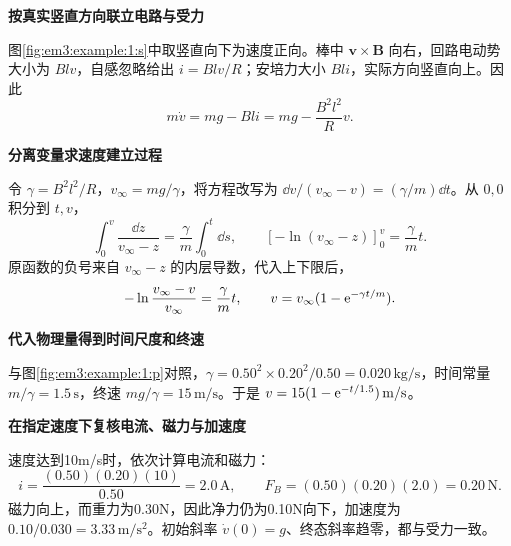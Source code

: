 \begin{solution}\textbf{按真实竖直方向联立电路与受力}\par\nobreak
图\ref{fig:em3:example:1:s}中取竖直向下为速度正向。棒中 $\bm v\times\bm B$ 向右，回路电动势大小为 $Blv$，自感忽略给出 $i=Blv/R$；安培力大小 $Bli$，实际方向竖直向上。因此
\[m\dot v=mg-Bli=mg-\frac{B^2l^2}{R}v.\]


\par\medskip{}\noindent\textbf{分离变量求速度建立过程}\par\nobreak
令 $\gamma=B^2l^2/R$，$v_\infty=mg/\gamma$，将方程改写为 $\dd v/(v_\infty-v)=(\gamma/m)\dd t$。从 $0,0$ 积分到 $t,v$，
\[
\int_0^v\frac{\dd z}{v_\infty-z}
=\frac{\gamma}{m}\int_0^t\dd s,\qquad
[-\ln(v_\infty-z)]_0^v=\frac\gamma m t.
\]
原函数的负号来自 $v_\infty-z$ 的内层导数，代入上下限后，
\[-\ln\frac{v_\infty-v}{v_\infty}=\frac\gamma m t,\qquad v=v_\infty(1-\mathrm e^{-\gamma t/m}).\]



\par\medskip{}\noindent\textbf{代入物理量得到时间尺度和终速}\par\nobreak
与图\ref{fig:em3:example:1:p}对照，$\gamma=0.50^2\times0.20^2/0.50=0.020\,\mathrm{kg/s}$，时间常量 $m/\gamma=1.5\,\mathrm s$，终速 $mg/\gamma=15\,\mathrm{m/s}$。于是 $v=15(1-\mathrm e^{-t/1.5})\,\mathrm{m/s}$。



\par\medskip{}\noindent\textbf{在指定速度下复核电流、磁力与加速度}\par\nobreak
速度达到10m/s时，依次计算电流和磁力：
\[i=\frac{(0.50)(0.20)(10)}{0.50}=2.0\,\mathrm A,\qquad F_B=(0.50)(0.20)(2.0)=0.20\,\mathrm N.\]
磁力向上，而重力为0.30N，因此净力仍为0.10N向下，加速度为 $0.10/0.030=3.33\,\mathrm{m/s^2}$。初始斜率 $\dot v(0)=g$、终态斜率趋零，都与受力一致。\end{solution}
